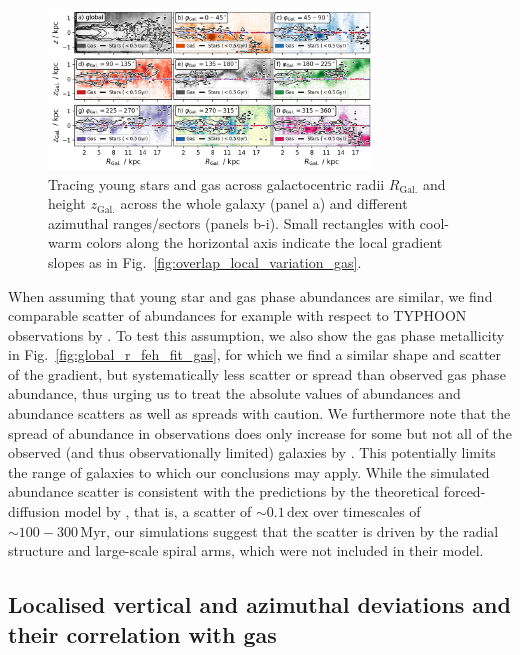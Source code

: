 \documentclass[twocolumn,apj,numberedappendix,appendixfloats,twocolappendix]{openjournal}
\begin{document}
\begin{CJK*}{UTF8}{gbsn}
\begin{figure}
    \centering
    \includegraphics[width=0.77\textwidth]{figures/tracing_young_stars_and_gas_in_angles.png}
    \caption{Tracing young stars and gas across galactocentric radii $R_\mathrm{Gal.}$ and height $z_\mathrm{Gal.}$ across the whole galaxy (panel a) and different azimuthal ranges/sectors (panels b-i). Small rectangles with cool-warm colors along the horizontal axis indicate the local gradient slopes as in Fig.~\ref{fig:overlap_local_variation_gas}.}
    \label{fig:tracing_young_stars_and_gas_in_angles}
\end{figure}

When assuming that young star and gas phase abundances are similar, we find comparable scatter of abundances for example with respect to TYPHOON observations by \citet{Chen2023}. To test this assumption, we also show the gas phase metallicity in Fig.~\ref{fig:global_r_feh_fit_gas}, for which we find a similar shape and scatter of the gradient, but systematically less scatter or spread than observed gas phase abundance, thus urging us to treat the absolute values of abundances and abundance scatters as well as spreads with caution. We furthermore note that the spread of abundance in observations does only increase for some but not all of the observed (and thus observationally limited) galaxies by \citet{Chen2023}. This potentially limits the range of galaxies to which our conclusions may apply. While the simulated abundance scatter is consistent with the predictions by the theoretical forced-diffusion model by \citet{Krumholz2018b}, that is, a scatter of $\sim 0.1\,\mathrm{dex}$ over timescales of $\sim 100-300\,\mathrm{Myr}$, our simulations suggest that the scatter is driven by the radial structure and large-scale spiral arms, which were not included in their model.

\subsection{Localised vertical and azimuthal deviations and their correlation with gas} \label{sec:discussion_coherence_position}


\end{CJK*}
\end{document}
